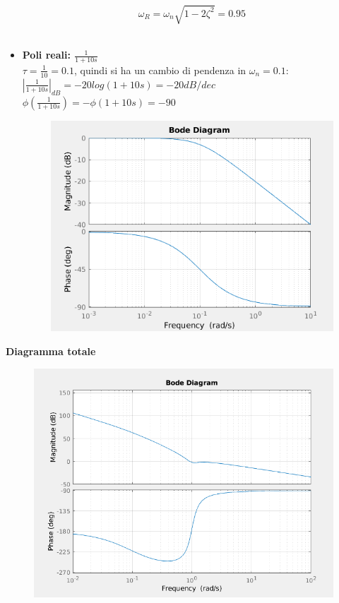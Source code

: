 \documentclass[12pt,a4paper]{article}
\begin{document}
\begin{itemize}
		\[
			\omega_R = \omega_n\sqrt{1-2\zeta^2} = 0.95
		\]
		\\
		\item \textbf{Poli reali: $\frac{1}{1+10s}$}\vspace{5px}\\
		$\tau = \frac{1}{10} = 0.1$, quindi si ha un cambio di pendenza in $\omega_n = 0.1$:\vspace{5px}\\
		$|\frac{1}{1+10s}|_{dB} = -20log(1+10s) = -20 dB/dec$\\
		$\phi(\frac{1}{1+10s}) = -\phi(1+10s) = -90$\degree
		\begin{figure}[h!]
			\centering
			\includegraphics[scale=0.5]{./images/bode41_3.png}
		\end{figure}
	\end{itemize}
	\newpage
	\textbf{Diagramma totale}
	\begin{figure}[h!]
		\centering
		\includegraphics[scale=0.6]{./images/bode41tot.png}
	\end{figure}
	\newpage
\end{document}
